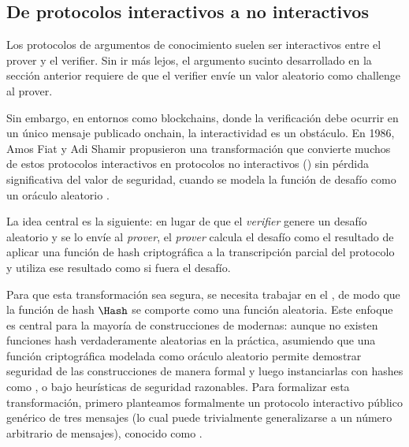 
\subsection{De protocolos interactivos a no interactivos}

Los protocolos de argumentos de conocimiento suelen ser interactivos entre el prover y el verifier. Sin ir más lejos, el argumento sucinto desarrollado en la sección anterior requiere de que el verifier envíe un valor aleatorio como challenge al prover.

Sin embargo, en entornos como blockchains, donde la verificación debe ocurrir en un único mensaje publicado onchain, la interactividad es un obstáculo. En 1986, Amos Fiat y Adi Shamir propusieron una transformación que convierte muchos de estos protocolos interactivos en protocolos no interactivos (\NIZK) sin pérdida significativa del valor de seguridad, cuando se modela la función de desafío como un oráculo aleatorio \cite{Fiat, Bellare1993}.

La idea central es la siguiente: en lugar de que el \textit{verifier} genere un desafío aleatorio y se lo envíe al \textit{prover}, el \textit{prover} calcula el desafío como el resultado de aplicar una función de hash criptográfica a la transcripción parcial del protocolo y utiliza ese resultado como si fuera el desafío.

Para que esta transformación sea segura, se necesita trabajar en el \ROM, de modo que la función de hash $\Hash$ se comporte como una función aleatoria. Este enfoque es central para la mayoría de construcciones de \zkSNARK modernas: aunque no existen funciones hash verdaderamente aleatorias en la práctica, asumiendo que una función criptográfica modelada como oráculo aleatorio permite demostrar seguridad de las construcciones de manera formal y luego instanciarlas con hashes como \SHATwoFiveSix, \BLAKETwo o \PoseidonHash bajo heurísticas de seguridad razonables. Para formalizar esta transformación, primero planteamos formalmente un protocolo interactivo público genérico de tres mensajes (lo cual puede trivialmente generalizarse a un número arbitrario de mensajes), conocido como \SigmaProtocol.

